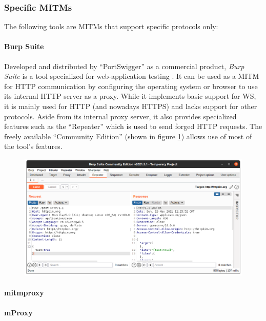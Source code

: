 \subsubsection{Specific \acp{MITM}}
The following tools are \acp{MITM} that support specific protocols only:
\paragraph{Burp Suite} Developed and distributed by \enquote{PortSwigger} as a commercial product, \emph{Burp Suite} is a tool specialized for web-application testing \cite{burpsuite}. It can be used as a \ac{MITM} for \ac{HTTP} communication by configuring the operating system or browser to use its internal \ac{HTTP} server as a proxy. While it implements basic support for \ac{WS}, it is mainly used for \ac{HTTP} (and nowadays \ac{HTTPS}) and lacks support for other protocols. Aside from its internal proxy server, it also provides specialized features such as the \enquote{Repeater} which is used to send forged \ac{HTTP} requests. The freely available \enquote{Community Edition} (shown in figure \ref{fig:burpsuite}) allows use of most of the tool's features.

\begin{figure}[h]
    \centering
    \includegraphics[width=14cm]{img/ch03/burpsuite.png}
    \label{fig:burpsuite}
\end{figure}
\paragraph{mitmproxy} %
\paragraph{mProxy}
